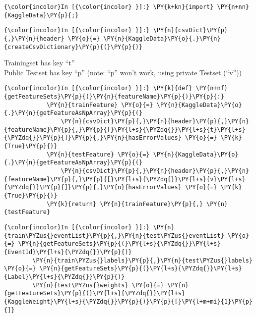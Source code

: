     \begin{Verbatim}[commandchars=\\\{\}]
{\color{incolor}In [{\color{incolor} }]:} \PY{k+kn}{import} \PY{n+nn}{KaggleData}\PY{p}{;}
\end{Verbatim}

    \begin{Verbatim}[commandchars=\\\{\}]
{\color{incolor}In [{\color{incolor} }]:} \PY{n}{csvDict}\PY{p}{,}\PY{n}{header} \PY{o}{=} \PY{n}{KaggleData}\PY{o}{.}\PY{n}{createCsvDictionary}\PY{p}{(}\PY{p}{)}
\end{Verbatim}

    Trainingset has key ``t''\\
Public Testset has key ``p'' (note: ``p'' won't work, using private
Testset (``v''))

    \begin{Verbatim}[commandchars=\\\{\}]
{\color{incolor}In [{\color{incolor} }]:} \PY{k}{def} \PY{n+nf}{getFeatureSets}\PY{p}{(}\PY{n}{featureName}\PY{p}{)}\PY{p}{:}
            \PY{n}{trainFeature} \PY{o}{=} \PY{n}{KaggleData}\PY{o}{.}\PY{n}{getFeatureAsNpArray}\PY{p}{(}
                \PY{n}{csvDict}\PY{p}{,}\PY{n}{header}\PY{p}{,}\PY{n}{featureName}\PY{p}{,}\PY{p}{[}\PY{l+s}{\PYZdq{}}\PY{l+s}{t}\PY{l+s}{\PYZdq{}}\PY{p}{]}\PY{p}{,}\PY{n}{hasErrorValues} \PY{o}{=} \PY{k}{True}\PY{p}{)}
            \PY{n}{testFeature} \PY{o}{=} \PY{n}{KaggleData}\PY{o}{.}\PY{n}{getFeatureAsNpArray}\PY{p}{(}
                \PY{n}{csvDict}\PY{p}{,}\PY{n}{header}\PY{p}{,}\PY{n}{featureName}\PY{p}{,}\PY{p}{[}\PY{l+s}{\PYZdq{}}\PY{l+s}{v}\PY{l+s}{\PYZdq{}}\PY{p}{]}\PY{p}{,}\PY{n}{hasErrorValues} \PY{o}{=} \PY{k}{True}\PY{p}{)}
            \PY{k}{return} \PY{n}{trainFeature}\PY{p}{,} \PY{n}{testFeature}
\end{Verbatim}

    \begin{Verbatim}[commandchars=\\\{\}]
{\color{incolor}In [{\color{incolor} }]:} \PY{n}{train\PYZus{}eventList}\PY{p}{,}\PY{n}{test\PYZus{}eventList} \PY{o}{=} \PY{n}{getFeatureSets}\PY{p}{(}\PY{l+s}{\PYZdq{}}\PY{l+s}{EventId}\PY{l+s}{\PYZdq{}}\PY{p}{)}
        \PY{n}{train\PYZus{}labels}\PY{p}{,}\PY{n}{test\PYZus{}labels} \PY{o}{=} \PY{n}{getFeatureSets}\PY{p}{(}\PY{l+s}{\PYZdq{}}\PY{l+s}{Label}\PY{l+s}{\PYZdq{}}\PY{p}{)}
        \PY{n}{test\PYZus{}weights} \PY{o}{=} \PY{n}{getFeatureSets}\PY{p}{(}\PY{l+s}{\PYZdq{}}\PY{l+s}{KaggleWeight}\PY{l+s}{\PYZdq{}}\PY{p}{)}\PY{p}{[}\PY{l+m+mi}{1}\PY{p}{]}
\end{Verbatim}

